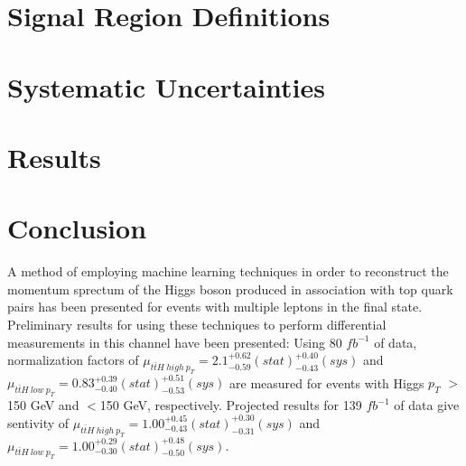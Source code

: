 \documentclass[12pt]{report}	%
\theoremstyle{definition}
\theoremstyle{remark}
\begin{document}

\section{Signal Region Definitions}
\label{sec:signal_region}



%


\section{Systematic Uncertainties}
\label{sec:sys}


                                                                
\section{Results}
\label{sec:results}



\section{Conclusion}
\label{part:conclusion}

A method of employing machine learning techniques in order to reconstruct the momentum sprectum of the Higgs boson produced in association with top quark pairs has been presented for events with multiple leptons in the final state. Preliminary results for using these techniques to perform differential measurements in this channel have been presented: Using 80 $fb^{-1}$ of data, normalization factors of $\mu_{t\bar{t}H\ high\ p_T} = 2.1^{+0.62}_{-0.59}(stat)^{+0.40}_{-0.43}(sys)$ and $\mu_{t\bar{t}H\ low\ p_T} = 0.83^{+0.39}_{-0.40}(stat)^{+0.51}_{-0.53}(sys)$ are measured for events with Higgs $p_T$ $>$150 GeV and $<$150 GeV, respectively. Projected results for 139 $fb^{-1}$ of data give sentivity of $\mu_{t\bar{t}H\ high\ p_T} = 1.00^{+0.45}_{-0.43}(stat)^{+0.30}_{-0.31}(sys)$ and $\mu_{t\bar{t}H\ low\ p_T} = 1.00^{+0.29}_{-0.30}(stat)^{+0.48}_{-0.50}(sys)$.
\end{document}
